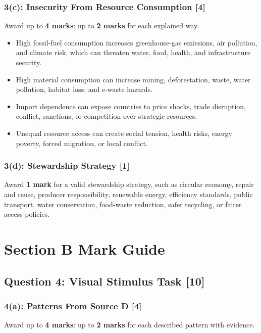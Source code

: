 \documentclass[11pt,a4paper]{article}
\newcommand{\score}[1]{\textcolor{AccentTeal}{\textbf{#1}}}
\begin{document}
\subsubsection{3(c): Insecurity From Resource Consumption [4]}

Award up to \score{4 marks}: up to \score{2 marks} for each explained way.

\begin{itemize}
  \item High fossil-fuel consumption increases greenhouse-gas emissions,
  air pollution, and climate risk, which can threaten water, food, health, and
  infrastructure security.
  \item High material consumption can increase mining, deforestation, waste,
  water pollution, habitat loss, and e-waste hazards.
  \item Import dependence can expose countries to price shocks, trade
  disruption, conflict, sanctions, or competition over strategic resources.
  \item Unequal resource access can create social tension, health risks, energy
  poverty, forced migration, or local conflict.
\end{itemize}

\subsubsection{3(d): Stewardship Strategy [1]}

Award \score{1 mark} for a valid stewardship strategy, such as circular
economy, repair and reuse, producer responsibility, renewable energy,
efficiency standards, public transport, water conservation, food-waste
reduction, safer recycling, or fairer access policies.

\section{Section B Mark Guide}

\subsection{Question 4: Visual Stimulus Task [10]}

\subsubsection{4(a): Patterns From Source D [4]}

Award up to \score{4 marks}: up to \score{2 marks} for each described pattern
with evidence.
\end{document}
